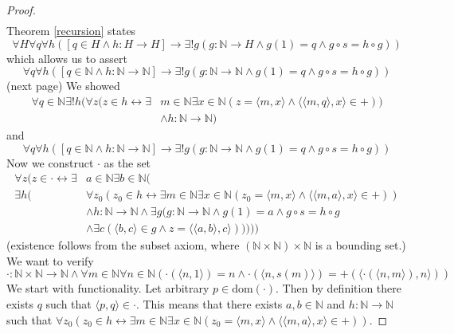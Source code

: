 \documentclass{report}
\begin{document}
\begin{proof}
\begin{align*}
\end{align*}
Theorem \ref{recursion} states
\begin{equation*}
\forall H\forall q\forall h([q\in H\land h:H\to H]\to\exists!g(g:\mathbb N\to H\land g(1)=q\land g\circ s=h\circ g))
\end{equation*}
which allows us to assert
\begin{equation*}
\forall q\forall h([q\in\mathbb N\land h:\mathbb N\to\mathbb N]\to\exists!g(g:\mathbb N\to\mathbb N\land g(1)=q\land g\circ s=h\circ g))
\end{equation*}
(next page)\newpage
We showed
\begin{align*}
\forall q\in\mathbb N\exists!h
(\forall z(z\in h\leftrightarrow\exists&m\in\mathbb N\exists x\in\mathbb N(z=\langle m,x\rangle\land\langle\langle m,q\rangle,x\rangle\in+))\\&\land h:\mathbb N\to\mathbb N)
\end{align*}
and
\begin{equation*}
\forall q\forall h([q\in\mathbb N\land h:\mathbb N\to\mathbb N]\to\exists!g(g:\mathbb N\to\mathbb N\land g(1)=q\land g\circ s=h\circ g))
\end{equation*}
Now we construct $\cdot$ as the set
\begin{align*}
\forall z(z\in\cdot\leftrightarrow\exists&a\in\mathbb N\exists b\in\mathbb N(\\
\exists h(&\forall z_0(z_0\in h\leftrightarrow\exists m\in\mathbb N\exists x\in\mathbb N(z_0=\langle m,x\rangle\land\langle\langle m,a\rangle,x\rangle\in+))\\
&\land h:\mathbb N\to\mathbb N\land\exists g(g:\mathbb N\to\mathbb N\land g(1)=a\land g\circ s=h\circ g\\
&\land\exists c(\langle b,c\rangle\in g\land z=\langle\langle a,b\rangle,c\rangle)))))
\end{align*}
(existence follows from the subset axiom, where $(\mathbb N\times\mathbb N)\times\mathbb N$ is a bounding set.) We want to verify
\begin{equation*}
\cdot:\mathbb N\times\mathbb N\to\mathbb N\land\forall m\in\mathbb N\forall n\in\mathbb N(\cdot(\langle n,1\rangle)=n\land\cdot(\langle n,s(m)\rangle)=+(\langle\cdot(\langle n,m\rangle),n\rangle))
\end{equation*}
We start with functionality. Let arbitrary $p\in\text{dom}(\cdot)$. Then by definition there exists $q$ such that $\langle p,q\rangle\in\cdot$. This means
that there exists $a,b\in\mathbb N$ and $h:\mathbb N\to\mathbb N$ such that 
$\forall z_0(z_0\in h\leftrightarrow\exists m\in\mathbb N\exists x\in\mathbb N(z_0=\langle m,x\rangle\land\langle\langle m,a\rangle,x\rangle\in+))$. 

\end{proof}
\end{document}
